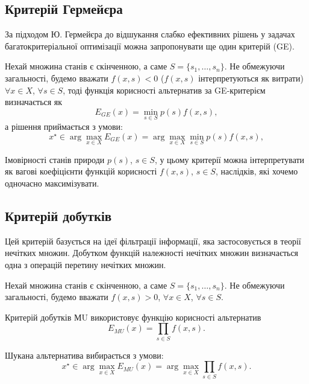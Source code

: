 \subsection{Критерій Гермейєра}

За підходом Ю. Гермейєра до відшукання слабко ефективних рішень у задачах багатокритеріальної оптимізації можна запропонувати ще один критерій (GE). \medskip

Нехай множина станів є скінченною, а саме $S = \{s_1, \ldots, s_n\}$. Не обмежуючи загальності, будемо вважати $f(x, s) < 0$ ($f(x, s)$ інтерпретуються як витрати) $\forall x \in X$, $\forall s \in S$, тоді функція корисності альтернатив за GE-критерієм визначається як 
\[E_{GE}(x) = \min\limits_{s \in S} p(s) f(x, s),\]
а рішення приймається з умови:
\[x^\star \in \arg\max\limits_{x \in X} E_{GE}(x) = \arg\max\limits_{x \in X} \min\limits_{s \in S} p(s) f(x, s),\]

Імовірності станів природи $p(s)$, $s \in S$, у цьому критерії можна інтерпретувати як вагові коефіцієнти функцій корисності $f(x, s)$, $s \in S$, наслідків, які хочемо одночасно максимізувати. 

\subsection{Критерій добутків}

Цей критерій базується на ідеї фільтрації інформації, яка застосовується в теорії нечітких множин. Добутком функцій належності нечітких множин визначається одна з операцій перетину нечітких множин. \medskip

Нехай множина станів є скінченною, а саме $S = \{s_1, \ldots, s_n\}$. Не обмежуючи загальності, будемо вважати $f(x, s) > 0$, $\forall x \in X$, $\forall s \in S$. \medskip

Критерій добутків МU використовує функцію корисності альтернатив 
\[E_{MU}(x) = \prod\limits_{s \in S} f(x, s).\]

Шукана альтернатива вибирається з умови:
\[x^\star \in \arg\max\limits_{x \in X} E_{MU}(x) = \arg\max\limits_{x \in X} \prod\limits_{s \in S} f(x, s).\]
